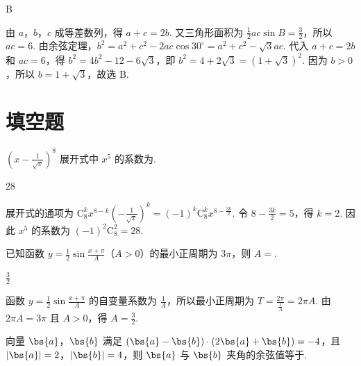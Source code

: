 \begin{answer}
B
\end{answer}

\begin{solution}
由 \(a\)，\(b\)，\(c\) 成等差数列，得 \(a+c=2b\). 又三角形面积为 \(\frac{1}{2}ac\sin B=\frac{3}{2}\)，所以 \(ac=6\). 由余弦定理，\(b^2=a^2+c^2-2ac\cos30^{\circ}=a^2+c^2-\sqrt{3}ac\). 代入 \(a+c=2b\) 和 \(ac=6\)，得 \(b^2=4b^2-12-6\sqrt{3}\)，即 \(b^2=4+2\sqrt{3}=(1+\sqrt{3})^2\). 因为 \(b>0\)，所以 \(b=1+\sqrt{3}\)，故选 B.
\end{solution}

\section{填空题}
\begin{problem}
\(\left(x - \frac{1}{\sqrt{x}}\right)^8\) 展开式中 \(x^5\) 的系数为\fillinblank{}.
\end{problem}

\begin{answer}
28
\end{answer}

\begin{solution}
展开式的通项为 \(\mathrm C_8^k x^{8-k}\left(-\frac{1}{\sqrt{x}}\right)^k=(-1)^k\mathrm C_8^k x^{8-\frac{3k}{2}}\). 令 \(8-\frac{3k}{2}=5\)，得 \(k=2\). 因此 \(x^5\) 的系数为 \((-1)^2\mathrm C_8^2=28\).
\end{solution}

\begin{problem}
已知函数 \(y = \frac{1}{2} \sin \frac{x + \pi}{A}\)（\(A > 0\)）的最小正周期为 \(3\pi\)，则 \(A =\)\fillinblank{}.
\end{problem}

\begin{answer}
\(\frac{3}{2}\)
\end{answer}

\begin{solution}
函数 \(y=\frac{1}{2}\sin\frac{x+\pi}{A}\) 的自变量系数为 \(\frac{1}{A}\)，所以最小正周期为 \(T=\frac{2\pi}{\frac{1}{A}}=2\pi A\). 由 \(2\pi A=3\pi\) 且 \(A>0\)，得 \(A=\frac{3}{2}\).
\end{solution}

\begin{problem}
向量 \(\bs{a}\)，\(\bs{b}\) 满足 \(\left(\bs{a} - \bs{b}\right) \cdot \left(2\bs{a} + \bs{b}\right) = -4\)，且 \(|\bs{a}| = 2\)，\(\left|\bs{b}\right| = 4\)，则 \(\bs{a}\) 与 \(\bs{b}\) 夹角的余弦值等于\fillinblank{}.
\end{problem}

